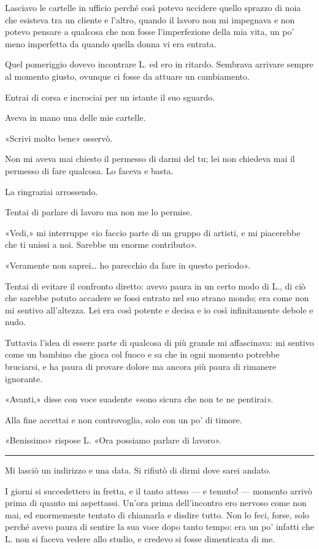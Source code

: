 \documentclass[a4paper,10pt]{memoir}
\begin{document}
Lasciavo le cartelle in ufficio perché così potevo uccidere quello sprazzo di noia che esisteva tra un cliente e
l'altro, quando il lavoro non mi impegnava e non potevo pensare a qualcosa che non fosse l'imperfezione della mia vita,
un po' meno imperfetta da quando quella donna vi era entrata.

Quel pomeriggio dovevo incontrare L. ed ero in ritardo. Sembrava arrivare sempre al momento giusto, ovunque ci fosse da
attuare un cambiamento.

Entrai di corsa e incrociai per un istante il suo sguardo.

Aveva in mano una delle mie cartelle.

«Scrivi molto bene» osservò.

Non mi aveva mai chiesto il permesso di darmi del tu; lei non chiedeva mai il permesso di fare qualcosa. Lo faceva e
basta.

La ringraziai arrossendo.

Tentai di parlare di lavoro ma non me lo permise.

«Vedi,» mi interruppe «io faccio parte di un gruppo di artisti, e mi piacerebbe che ti unissi a noi. Sarebbe un enorme
contributo».

«Veramente non saprei\dots{} ho parecchio da fare in questo periodo».

Tentai di evitare il confronto diretto: avevo paura in un certo modo di L., di ciò che sarebbe potuto accadere se fossi
entrato nel suo strano mondo; era come non mi sentivo all'altezza. Lei era così potente e decisa e io così infinitamente
debole e nudo.

Tuttavia l'idea di essere parte di qualcosa di più grande mi affascinava: mi sentivo come un bambino che gioca col fuoco
e sa che in ogni momento potrebbe bruciarsi, e ha paura di provare dolore ma ancora più paura di rimanere ignorante.

«Avanti,» disse con voce suadente «sono sicura che non te ne pentirai».

Alla fine accettai e non controvoglia, solo con un po' di timore.

«Benissimo» rispose L. «Ora possiamo parlare di lavoro».

\plainbreak{1}

Mi lasciò un indirizzo e una data. Si rifiutò di dirmi dove sarei andato.

I giorni si succedettero in fretta, e il tanto atteso --- e temuto! --- momento arrivò prima di quanto mi aspettassi.
Un'ora prima dell'incontro ero nervoso come non mai, ed enormemente tentato di chiamarla e disdire tutto. Non lo feci,
forse, solo perché avevo paura di sentire la sua voce dopo tanto tempo: era un po' infatti che L. non si faceva vedere
allo studio, e credevo si fosse dimenticata di me.
\end{document}
